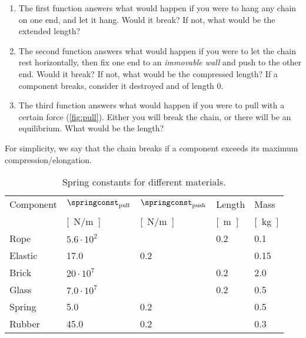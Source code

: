 \begin{gradedexercise}
\begin{enumerate}
              \begin{enumerate}
                  \item The first function answers what would happen if you were to hang any chain on one end, and let it hang.
                        Would it break?
                        If not, what would be the extended length?
                  \item The second function answers what would happen if you were to let the chain rest horizontally, then fix one end to an \emph{immovable wall} and push to the other end.
                        Would it break?
                        If not, what would be the compressed length?
                        If a component breaks, consider it destroyed and of length 0.
                  \item The third function answers what would happen if you were to pull with a certain force (\cref{fig:pull}).
                        Either you will break the chain, or there will be an equilibrium.
                        What would be the length?
              \end{enumerate}

              \begin{hint}
                  For simplicity, we say that the chain breaks if a component exceeds its maximum compression/elongation.
              \end{hint}
    \end{enumerate}
\end{gradedexercise}



\begin{table}
    \centering
    \footnotesize
    \begin{tabular}{lllll}
        Component & $\springconst_\mathrm{pull}$ & $\springconst_\mathrm{push}$ & Length       & Mass \\
                  & \unit[]{[N/m]}               & \unit[]{[N/m]}               & \unit[]{[m]} & \unit[]{[kg]} \\
        \toprule
        Rope      & $5.6\cdot 10^2$              &                              & 0.2          & 0.1 \\
        Elastic   & 17.0                         & 0.2                          &              & 0.15 \\
        Brick     & $20\cdot 10^7$               &                              & 0.2          & 2.0 \\
        Glass     & $7.0\cdot 10^7$              &                              & 0.2          & 0.5 \\
        Spring    & 5.0                          & 0.2                          &              & 0.5 \\
        Rubber    & 45.0                         & 0.2                          &              & 0.3
    \end{tabular}
    \caption{Spring constants for different materials.
    }
    \label{tab:spring_const}
\end{table}

